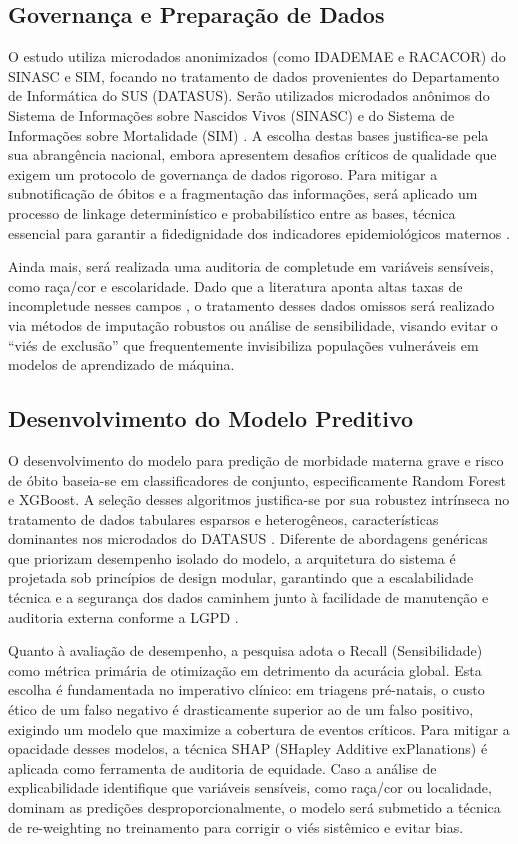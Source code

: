 \documentclass[12pt]{article}
\begin{document}
\subsection{Governança e Preparação de Dados}
O estudo utiliza microdados anonimizados (como IDADEMAE e RACACOR) do SINASC e SIM, focando no tratamento de dados provenientes do Departamento de Informática do SUS (DATASUS). Serão utilizados microdados anônimos do Sistema de Informações sobre Nascidos Vivos (SINASC) e do Sistema de Informações sobre Mortalidade (SIM) \cite{ThemeFilha2014}. A escolha destas bases justifica-se pela sua abrangência nacional, embora apresentem desafios críticos de qualidade que exigem um protocolo de governança de dados rigoroso. Para mitigar a subnotificação de óbitos e a fragmentação das informações, será aplicado um processo de linkage determinístico e probabilístico entre as bases, técnica essencial para garantir a fidedignidade dos indicadores epidemiológicos maternos \cite{Carvalho2019, Silva2006}.

Ainda mais, será realizada uma auditoria de completude em variáveis sensíveis, como raça/cor e escolaridade. Dado que a literatura aponta altas taxas de incompletude nesses campos \cite{ThemeFilha2012, Santos2021}, o tratamento desses dados omissos será realizado via métodos de imputação robustos ou análise de sensibilidade, visando evitar o “viés de exclusão” que frequentemente invisibiliza populações vulneráveis em modelos de aprendizado de máquina.

\subsection{Desenvolvimento do Modelo Preditivo}
O desenvolvimento do modelo para predição de morbidade materna grave e risco de óbito baseia-se em classificadores de conjunto, especificamente Random Forest e XGBoost. A seleção desses algoritmos justifica-se por sua robustez intrínseca no tratamento de dados tabulares esparsos e heterogêneos, características dominantes nos microdados do DATASUS \cite{Cetin2020}. Diferente de abordagens genéricas que priorizam desempenho isolado do modelo, a arquitetura do sistema é projetada sob princípios de design modular, garantindo que a escalabilidade técnica e a segurança dos dados caminhem junto à facilidade de manutenção e auditoria externa conforme a LGPD \cite{dosReis2024}.

Quanto à avaliação de desempenho, a pesquisa adota o Recall (Sensibilidade) como métrica primária de otimização em detrimento da acurácia global. Esta escolha é fundamentada no imperativo clínico: em triagens pré-natais, o custo ético de um falso negativo é drasticamente superior ao de um falso positivo, exigindo um modelo que maximize a cobertura de eventos críticos. Para mitigar a opacidade desses modelos, a técnica SHAP (SHapley Additive exPlanations)\cite{Lundberg2017} é aplicada como ferramenta de auditoria de equidade. Caso a análise de explicabilidade identifique que variáveis sensíveis, como raça/cor ou localidade, dominam as predições desproporcionalmente, o modelo será submetido a técnica de re-weighting no treinamento para corrigir o viés sistêmico e evitar bias.
\end{document}

